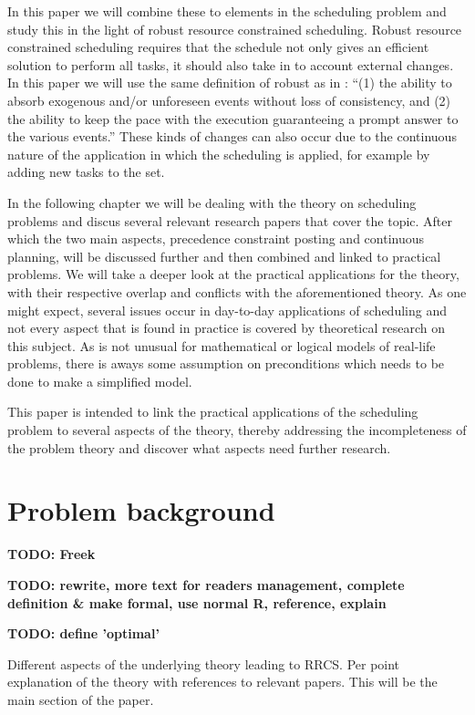 \documentclass{article}
\newcommand{\TODO}[1]{{\color{red}\textbf{TODO: #1}}}
\begin{document}
In this paper we will combine these to elements in the scheduling problem and study this in the light of robust resource constrained scheduling.
Robust resource constrained scheduling requires that the schedule not only gives an efficient solution to perform all tasks, it should also take in to account external changes.
In this paper we will use the same definition of robust as in \cite{policella07} : ``{(1) the ability to absorb exogenous and/or unforeseen events without loss of consistency, and (2) the ability to keep the pace with the execution guaranteeing a prompt answer to the various events.}''
These kinds of changes can also occur due to the continuous nature of the application in which the scheduling is applied, for example by adding new tasks to the set.

In the following chapter we will be dealing with the theory on scheduling problems and discus several relevant research papers that cover the topic.
After which the two main aspects, precedence constraint posting and continuous planning, will be discussed further and then combined and linked to practical problems.
We will take a deeper look at the practical applications for the theory, with their respective overlap and conflicts with the aforementioned theory.
As one might expect, several issues occur in day-to-day applications of scheduling and not every aspect that is found in practice is covered by theoretical research on this subject.
As is not unusual for mathematical or logical models of real-life problems, there is aways some assumption on preconditions which needs to be done to make a simplified model.

This paper is intended to link the practical applications of the scheduling problem to several aspects of the theory, thereby addressing the incompleteness of the problem theory and discover what aspects need further research.

\newpage

\section{Problem background}
\TODO{Freek}

\TODO{rewrite, more text for readers management, complete definition \& make formal, use normal R, reference, explain}

\TODO{define 'optimal'}

Different aspects of the underlying theory leading to RRCS.
 Per point explanation of the theory with references to relevant papers.
This will be the main section of the paper.
\end{document}
